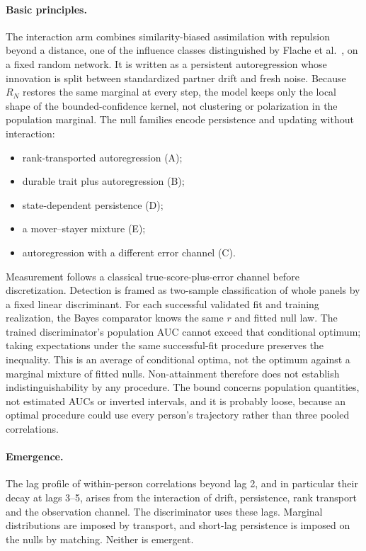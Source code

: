 \paragraph{Basic principles.}
The interaction arm combines similarity-biased assimilation with repulsion beyond a distance, one of the influence classes distinguished by Flache et al.\ \cite{flache2017}, on a fixed random network. It is written as a persistent autoregression whose innovation is split between standardized partner drift and fresh noise. Because $R_N$ restores the same marginal at every step, the model keeps only the local shape of the bounded-confidence kernel, not clustering or polarization in the population marginal. The null families encode persistence and updating without interaction:
\begin{itemize}
\item rank-transported autoregression (A);
\item durable trait plus autoregression (B);
\item state-dependent persistence (D);
\item a mover--stayer mixture (E);
\item autoregression with a different error channel (C).
\end{itemize}
Measurement follows a classical true-score-plus-error channel before discretization. Detection is framed as two-sample classification of whole panels by a fixed linear discriminant. For each successful validated fit and training realization, the Bayes comparator knows the same $r$ and fitted null law. The trained discriminator's population AUC cannot exceed that conditional optimum; taking expectations under the same successful-fit procedure preserves the inequality. This is an average of conditional optima, not the optimum against a marginal mixture of fitted nulls. Non-attainment therefore does not establish indistinguishability by any procedure. The bound concerns population quantities, not estimated AUCs or inverted intervals, and it is probably loose, because an optimal procedure could use every person's trajectory rather than three pooled correlations.

\paragraph{Emergence.}
The lag profile of within-person correlations beyond lag 2, and in particular their decay at lags 3--5, arises from the interaction of drift, persistence, rank transport and the observation channel. The discriminator uses these lags. Marginal distributions are imposed by transport, and short-lag persistence is imposed on the nulls by matching. Neither is emergent.

